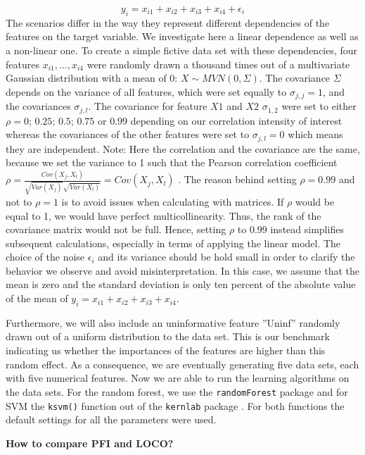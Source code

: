 \documentclass[]{krantz}
\begin{document}
\[
y_{i} = x_{i1}+x_{i2}+x_{i3}+x_{i4}+\epsilon_{i}
\] The scenarios differ in the way they represent different dependencies
of the features on the target variable. We investigate here a linear
dependence as well as a non-linear one. To create a simple fictive data
set with these dependencies, four features \(x_{i1},...,x_{i4}\) were
randomly drawn a thousand times out of a multivariate Gaussian
distribution with a mean of 0: \(X \sim MVN(0,\Sigma)\). The covariance
\(\Sigma\) depends on the variance of all features, which were set
equally to \(\sigma_{j,j}=1\), and the covariances \(\sigma_{j,l}\). The
covariance for feature \(X1\) and \(X2\) \(\sigma_{1,2}\) were set to
either \(\rho = 0\); \(0.25\); \(0.5\); \(0.75\) or \(0.99\) depending
on our correlation intensity of interest whereas the covariances of the
other features were set to \(\sigma_{j,l} = 0\) which means they are
independent. Note: Here the correlation and the covariance are the same,
because we set the variance to 1 such that the Pearson correlation
coefficient
\(\rho = \frac{Cov(X_{j},X_{l})}{\sqrt{Var(X_{j})}\sqrt{Var(X_{l})}} =Cov(X_{j},X_{l})\)
. The reason behind setting \(\rho = 0.99\) and not to \(\rho = 1\) is
to avoid issues when calculating with matrices. If \(\rho\) would be
equal to 1, we would have perfect multicollinearity. Thus, the rank of
the covariance matrix would not be full. Hence, setting \(\rho\) to 0.99
instead simplifies subsequent calculations, especially in terms of
applying the linear model. The choice of the noise \(\epsilon_{i}\) and
its variance should be hold small in order to clarify the behavior we
observe and avoid misinterpretation. In this case, we assume that the
mean is zero and the standard deviation is only ten percent of the
absolute value of the mean of \(y_{i} = x_{i1}+x_{i2}+x_{i3}+x_{i4}\).

Furthermore, we will also include an uninformative feature ''Uninf''
randomly drawn out of a uniform distribution to the data set. This is
our benchmark indicating us whether the importances of the features are
higher than this random effect. As a consequence, we are eventually
generating five data sets, each with five numerical features. Now we are
able to run the learning algorithms on the data sets. For the random
forest, we use the \texttt{randomForest} package \citep{R-randomForest}
and for SVM the \texttt{ksvm()} function out of the \texttt{kernlab}
package \citep{R-kernlab}. For both functions the default settings for
all the parameters were used.

\textbf{How to compare PFI and LOCO?}
\end{document}
